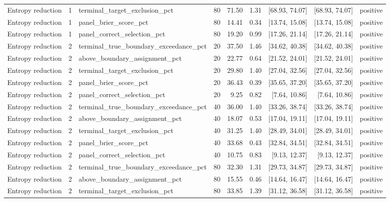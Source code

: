 \begin{longtable}{lllrrrrrl}
Entropy reduction & 1 & terminal\_target\_exclusion\_pct & 80 & 71.50 & 1.31 & [68.93, 74.07] & [68.93, 74.07] & positive \\
Entropy reduction & 1 & panel\_brier\_score\_pct & 80 & 14.41 & 0.34 & [13.74, 15.08] & [13.74, 15.08] & positive \\
Entropy reduction & 1 & panel\_correct\_selection\_pct & 80 & 19.20 & 0.99 & [17.26, 21.14] & [17.26, 21.14] & positive \\
Entropy reduction & 2 & terminal\_true\_boundary\_exceedance\_pct & 20 & 37.50 & 1.46 & [34.62, 40.38] & [34.62, 40.38] & positive \\
Entropy reduction & 2 & above\_boundary\_assignment\_pct & 20 & 22.77 & 0.64 & [21.52, 24.01] & [21.52, 24.01] & positive \\
Entropy reduction & 2 & terminal\_target\_exclusion\_pct & 20 & 29.80 & 1.40 & [27.04, 32.56] & [27.04, 32.56] & positive \\
Entropy reduction & 2 & panel\_brier\_score\_pct & 20 & 36.43 & 0.39 & [35.65, 37.20] & [35.65, 37.20] & positive \\
Entropy reduction & 2 & panel\_correct\_selection\_pct & 20 & 9.25 & 0.82 & [7.64, 10.86] & [7.64, 10.86] & positive \\
Entropy reduction & 2 & terminal\_true\_boundary\_exceedance\_pct & 40 & 36.00 & 1.40 & [33.26, 38.74] & [33.26, 38.74] & positive \\
Entropy reduction & 2 & above\_boundary\_assignment\_pct & 40 & 18.07 & 0.53 & [17.04, 19.11] & [17.04, 19.11] & positive \\
Entropy reduction & 2 & terminal\_target\_exclusion\_pct & 40 & 31.25 & 1.40 & [28.49, 34.01] & [28.49, 34.01] & positive \\
Entropy reduction & 2 & panel\_brier\_score\_pct & 40 & 33.68 & 0.43 & [32.84, 34.51] & [32.84, 34.51] & positive \\
Entropy reduction & 2 & panel\_correct\_selection\_pct & 40 & 10.75 & 0.83 & [9.13, 12.37] & [9.13, 12.37] & positive \\
Entropy reduction & 2 & terminal\_true\_boundary\_exceedance\_pct & 80 & 32.30 & 1.31 & [29.73, 34.87] & [29.73, 34.87] & positive \\
Entropy reduction & 2 & above\_boundary\_assignment\_pct & 80 & 15.55 & 0.46 & [14.64, 16.47] & [14.64, 16.47] & positive \\
Entropy reduction & 2 & terminal\_target\_exclusion\_pct & 80 & 33.85 & 1.39 & [31.12, 36.58] & [31.12, 36.58] & positive \\

\end{longtable}
